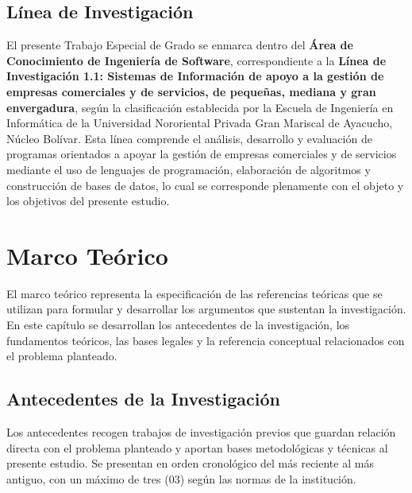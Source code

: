 \documentclass[12pt, letterpaper]{report}
\begin{document}
\section{Línea de Investigación}

El presente Trabajo Especial de Grado se enmarca dentro del
\textbf{Área de Conocimiento de Ingeniería de Software}, correspondiente
a la \textbf{Línea de Investigación 1.1: Sistemas de Información de
apoyo a la gestión de empresas comerciales y de servicios, de pequeñas,
mediana y gran envergadura}, según la clasificación establecida por la
Escuela de Ingeniería en Informática de la Universidad Nororiental
Privada Gran Mariscal de Ayacucho, Núcleo Bolívar. Esta línea
comprende el análisis, desarrollo y evaluación de programas orientados
a apoyar la gestión de empresas comerciales y de servicios mediante el
uso de lenguajes de programación, elaboración de algoritmos y
construcción de bases de datos, lo cual se corresponde plenamente con
el objeto y los objetivos del presente estudio.



\chapter{Marco Teórico}

El marco teórico representa la especificación de las referencias
teóricas que se utilizan para formular y desarrollar los argumentos
que sustentan la investigación. En este capítulo se desarrollan los
antecedentes de la investigación, los fundamentos teóricos, las bases
legales y la referencia conceptual relacionados con el problema
planteado.

\section{Antecedentes de la Investigación}

Los antecedentes recogen trabajos de investigación previos que guardan
relación directa con el problema planteado y aportan bases metodológicas
y técnicas al presente estudio. Se presentan en orden cronológico del
más reciente al más antiguo, con un máximo de tres (03) según las
normas de la institución.
\end{document}
